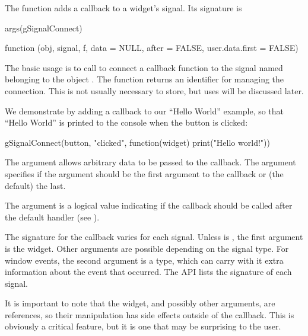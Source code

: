 The  function adds a callback to a widget's
signal. Its signature is
\begin{Schunk}
\begin{Sinput}
 args(gSignalConnect)
\end{Sinput}
\end{Schunk}
\begin{Soutput}
function (obj, signal, f, data = NULL, after = FALSE, 
          user.data.first = FALSE) 
\end{Soutput}
%
The basic usage is to call  to connect a
callback function  to the signal named
 belonging to the object
. The function returns an identifier for
managing the connection. This is not usually necessary to store, but uses will be
discussed later.

We demonstrate  by adding a callback to our ``Hello World''
example, so that ``Hello World'' is printed to the console when the
button is clicked:
\begin{Schunk}
\begin{Sinput}
 gSignalConnect(button, "clicked", 
                function(widget) print("Hello world!"))
\end{Sinput}
\end{Schunk}
%

The  argument allows arbitrary data to
be passed to the callback.  The
 argument specifies if the
 argument should be the first argument
to the callback or (the default) the last.

The  argument is a logical value
indicating if the callback should be called after the default handler
(see ).

The signature for the callback varies for each signal. Unless
 is , the first argument is the
widget. Other arguments are possible depending on the signal type. For
window events, the second argument is a  type, which
can carry with it extra information about the event that occurred. The
\GTK\/ API lists the signature of each signal.

It is important to note that the widget, and possibly other arguments,
are references, so their manipulation has side effects outside of the
callback. This is obviously a critical feature, but it is one that
may be surprising to the \R\/ user.

